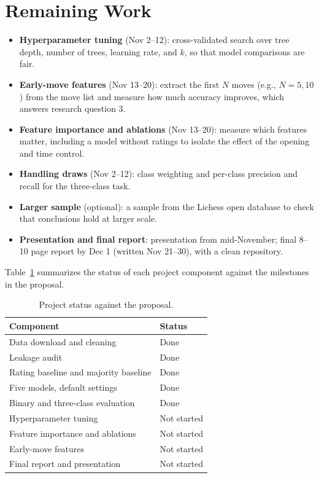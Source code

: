 \documentclass[sigconf]{acmart}
\begin{document}
\section{Remaining Work}\label{sec:remaining}
\begin{itemize}
  \item \textbf{Hyperparameter tuning} (Nov 2--12): cross-validated search over tree depth, number of trees, learning rate, and $k$, so that model comparisons are fair.
  \item \textbf{Early-move features} (Nov 13--20): extract the first $N$ moves (e.g., $N=5, 10$) from the move list and measure how much accuracy improves, which answers research question 3.
  \item \textbf{Feature importance and ablations} (Nov 13--20): measure which features matter, including a model without ratings to isolate the effect of the opening and time control.
  \item \textbf{Handling draws} (Nov 2--12): class weighting and per-class precision and recall for the three-class task.
  \item \textbf{Larger sample} (optional): a sample from the Lichess open database to check that conclusions hold at larger scale.
  \item \textbf{Presentation and final report}: presentation from mid-November; final 8--10 page report by Dec 1 (written Nov 21--30), with a clean repository.
\end{itemize}

Table~\ref{tab:status} summarizes the status of each project component against the milestones in the proposal.

\begin{table}[h]
  \caption{Project status against the proposal.}
  \label{tab:status}
  \footnotesize
  \begin{tabular}{@{}p{1.5in}p{1.4in}@{}}
    \toprule
    Component & Status \\
    \midrule
    Data download and cleaning & Done \\
    Leakage audit & Done \\
    Rating baseline and majority baseline & Done \\
    Five models, default settings & Done \\
    Binary and three-class evaluation & Done \\
    Hyperparameter tuning & Not started \\
    Feature importance and ablations & Not started \\
    Early-move features & Not started \\
    Final report and presentation & Not started \\
    \bottomrule
  \end{tabular}
\end{table}
\end{document}
